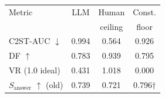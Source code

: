 \setlength{\tabcolsep}{3.5pt}
\begin{tabular}{lccc}
\toprule
Metric & LLM & Human & Const.\\
 & & ceiling & floor\\
\midrule
C2ST-AUC $\downarrow$ & 0.994 & 0.564 & 0.926\\
DF $\uparrow$ & 0.783 & 0.939 & 0.795\\
VR (1.0 ideal) & 0.431 & 1.018 & 0.000\\
$S_{\mathrm{answer}}$ $\uparrow$ (old) & 0.739 & 0.721 & 0.796\;$\dagger$\\
\bottomrule
\end{tabular}
